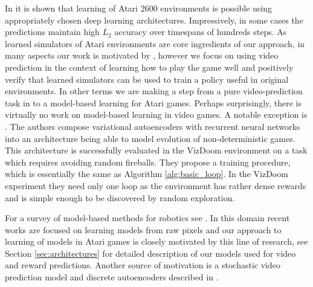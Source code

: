 In \cite{recurrent,video_prediction} it is shown that learning of Atari 2600 environments is possible using appropriately chosen deep learning architectures. Impressively, in some cases the predictions maintain high $L_2$ accuracy over timespans of hundreds steps. %
As learned simulators of Atari environments are core ingredients of our approach, in many aspects our work is motivated by \cite{recurrent,video_prediction}, however we focus on using video prediction in the context of learning how to play the game well and positively verify that learned simulators can be used to train a policy useful in original environments. In other terms we are making a step from a pure video-prediction task in \cite{recurrent,video_prediction} to a model-based learning for Atari games. 
Perhaps surprisingly, there is virtually no work on model-based learning in video games. A notable exception is 
\cite{world_models}. The authors compose variational autoencoders with recurrent neural networks into an architecture being able to model evolution of non-deterministic games. This architecture is successfully evaluated in the VizDoom environment on a task which requires avoiding random fireballs. They propose a training procedure, which is essentially the same as Algorithm \ref{alg:basic_loop}. In the VizDoom experiment they need only one loop as the environment has rather dense rewards and is simple enough to be discovered by random exploration. %

For a survey of model-based methods for robotics see \cite[Chapter 3]{deisenroth}. In this domain recent works  \cite{finn2016, ebert, hafner, piergiovanni, paxton, rybkin-pertsch}  are focused on learning models from raw pixels and our approach to learning of models in Atari games is closely motivated by this line of research, see Section \ref{sec:architectures} for detailed description of our models used for video and reward predictions.  Another source of motivation is a stochastic video prediction model \cite{sv2p} and discrete autoencoders described in \cite{neural_discrete, auto_discrete}.   %

